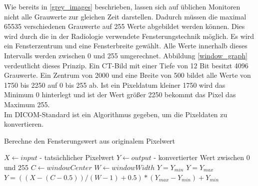 Wie bereits in \ref{grey_images} beschrieben, lassen sich auf üblichen Monitoren nicht alle Grauwerte zur gleichen Zeit darstellen. Dadurch müssen die maximal 65535 verschiedenen Grauwerte auf 255 Werte abgebildet werden können. Dies wird durch die in der Radiologie verwendete Fensterungstechnik möglich\cite[Kapitel 8, Seite 249]{handels:mbv}. Es wird ein Fensterzentrum und eine Fensterbreite gewählt. Alle Werte innerhalb dieses Intervalls werden zwischen 0 und 255 umgerechnet. Abbildung \ref{window_graph} verdeutlicht dieses Prinzip. Ein CT-Bild mit einer Tiefe von 12 Bit besitzt 4096 Grauwerte. Ein Zentrum von 2000 und eine Breite von 500 bildet alle Werte von 1750 bis 2250 auf 0 bis 255 ab. Ist ein Pixeldatum kleiner 1750 wird das Minimum 0 hinterlegt und ist der Wert größer 2250 bekommt das Pixel das Maximum 255.\\
Im DICOM-Standard ist ein Algorithmus gegeben, um die Pixeldaten zu konvertieren\cite[C.11.2.1.2]{dicom:iod}.

\begin{algorithm}
\caption{Berechne den Fensterungswert aus originalem Pixelwert}
\begin{algorithmic}[1] 
\STATE $X \leftarrow input$ - tatsächlicher Pixelwert
\STATE $Y \leftarrow output$ - konvertierter Wert zwischen 0 und 255
\STATE $C \leftarrow windowCenter$
\STATE $W \leftarrow windowWidth$
	\STATE  $Y = Y_{min}$
	\STATE $Y = Y_{max}$
\ELSE
	\STATE $Y = ((X-(C-0.5)) / (W-1)+0.5)*(Y_{max}-Y_{min})+Y_{min}$
\ENDIF
\end{algorithmic}
\end{algorithm}


